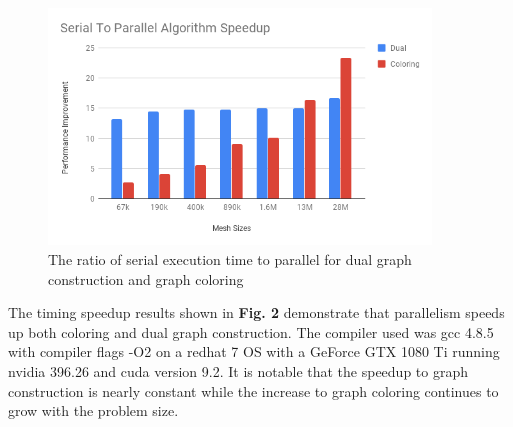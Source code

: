 \documentclass[graybox]{svmult}
\begin{document}
\begin{figure}[!ht]
	\centering
	\includegraphics[width=4in]{images/Parallel_Speedup.png}
	\caption{The ratio of serial execution time to parallel for dual graph construction and graph coloring}
	\label{fig:coloringSpeedup}
\end{figure}
The timing speedup results shown in \textbf{Fig. 2} demonstrate that parallelism speeds up both coloring and dual graph construction. The compiler used was gcc 4.8.5 with compiler flags -O2 on a redhat 7 OS with a GeForce GTX 1080 Ti running nvidia 396.26 and cuda version 9.2. It is notable that the speedup to graph construction is nearly constant while the increase to graph coloring continues to grow with the problem size.
\end{document}
